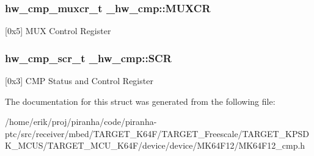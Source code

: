 \subsubsection[{\texorpdfstring{M\+U\+X\+CR}{MUXCR}}]{ {\bf hw\+\_\+cmp\+\_\+muxcr\+\_\+t} \+\_\+hw\+\_\+cmp\+::\+M\+U\+X\+CR}\hypertarget{struct__hw__cmp_a3b890f5539437bb51ae709d1969e8df4}{}\label{struct__hw__cmp_a3b890f5539437bb51ae709d1969e8df4}
\mbox{[}0x5\mbox{]} M\+UX Control Register 
\subsubsection[{\texorpdfstring{S\+CR}{SCR}}]{ {\bf hw\+\_\+cmp\+\_\+scr\+\_\+t} \+\_\+hw\+\_\+cmp\+::\+S\+CR}\hypertarget{struct__hw__cmp_ab60de41ae24fc0597e45f1762272d579}{}\label{struct__hw__cmp_ab60de41ae24fc0597e45f1762272d579}
\mbox{[}0x3\mbox{]} C\+MP Status and Control Register 

The documentation for this struct was generated from the following file\+:\begin{DoxyCompactItemize}
\item 
/home/erik/proj/piranha/code/piranha-\/ptc/src/receiver/mbed/\+T\+A\+R\+G\+E\+T\+\_\+\+K64\+F/\+T\+A\+R\+G\+E\+T\+\_\+\+Freescale/\+T\+A\+R\+G\+E\+T\+\_\+\+K\+P\+S\+D\+K\+\_\+\+M\+C\+U\+S/\+T\+A\+R\+G\+E\+T\+\_\+\+M\+C\+U\+\_\+\+K64\+F/device/device/\+M\+K64\+F12/M\+K64\+F12\+\_\+cmp.\+h\end{DoxyCompactItemize}
